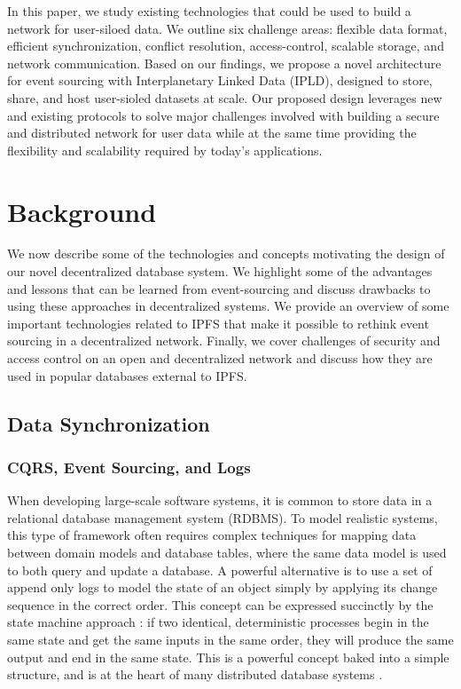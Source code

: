 \documentclass{textile}
\begin{document}
In this paper, we study existing technologies that could be used to build a network for user-siloed data. We outline six challenge areas: flexible data format, efficient synchronization, conflict resolution, access-control, scalable storage, and network communication. Based on our findings, we propose a novel architecture for event sourcing with Interplanetary Linked Data (IPLD), designed to store, share, and host user-sioled datasets at scale. Our proposed design leverages new and existing protocols to solve major challenges involved with building a secure and distributed network for user data while at the same time providing the flexibility and scalability required by today's applications. 


\section{Background}
\label{sec:Background}

We now describe some of the technologies and concepts motivating the design of our novel decentralized database system. We highlight some of the advantages and lessons that can be learned from event-sourcing and discuss drawbacks to using these approaches in decentralized systems. We provide an overview of some important technologies related to IPFS that make it possible to rethink event sourcing in a decentralized network. Finally, we cover challenges of security and access control on an open and decentralized network and discuss how they are used in popular databases external to IPFS. 

\subsection{Data Synchronization}

\subsubsection{CQRS, Event Sourcing, and Logs}\label{sec:cqrs}

When developing large-scale software systems, it is common to store data in a relational database management system (RDBMS). To model realistic systems, this type of framework often requires complex techniques for mapping data between domain models and database tables, where the same data model is used to both query and update a database. A powerful alternative is to use a set of append only logs to model the state of an object simply by applying its change sequence in the correct order. This concept can be expressed succinctly by the state machine approach \cite{schneiderImplementingFaulttolerantServices1990}: if two identical, deterministic processes begin in the same state and get the same inputs in the same order, they will produce the same output and end in the same state. This is a powerful concept baked into a simple structure, and is at the heart of many distributed database systems \cite{jaykrepsLogWhatEvery2013}.
\end{document}
